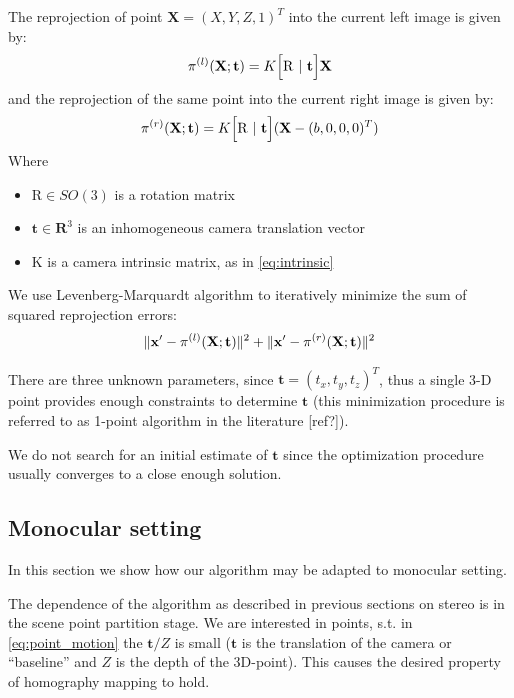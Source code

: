\documentclass{bmvc2k}
\DeclarePairedDelimiter{\norm}{\lVert}{\rVert}
\begin{document}
The reprojection of point $\mathbf{X}=(X,Y,Z,1)^T$ into the current
left image is given by:
\begin{equation}
  \pi^{(l)}(\mathbf{X};\mathbf{t}) =  K\Bigl[ \mathrm{R}\ |\ \mathbf{t} \Bigr]\mathbf{X} 
\end{equation}
and the reprojection of the same point into the current right image is
given by:
\begin{equation}
  \pi^{(r)}(\mathbf{X};\mathbf{t}) =  K\Bigl[ \mathrm{R}\ |\ \mathbf{t} \Bigr](\mathbf{X} - (b,0,0,0)^T)
\end{equation}
Where 
\begin{itemize}
\item $\mathrm{R}\in SO(3)$ is a rotation matrix
\item $\mathbf{t}\in \mathbf{R}^3$ is an inhomogeneous camera translation vector
\item $\mathrm{K}$ is a camera intrinsic matrix, as in \ref{eq:intrinsic}
\end{itemize}

We use Levenberg-Marquardt algorithm to iteratively minimize the sum
of squared reprojection errors:
\begin{equation}
\norm{\mathbf{x'} - \pi^{(l)}(\mathbf{X};\mathbf{t})}^2 + \norm{\mathbf{x'} - \pi^{(r)}(\mathbf{X};\mathbf{t})}^2
\end{equation}

There are three unknown parameters, since $\mathbf{t} =
(t_x,t_y,t_z)^T$, thus a single 3-D point provides enough constraints
to determine $\mathbf{t}$ (this minimization procedure is referred to
as 1-point algorithm in the literature [ref?]).

We do not search for an initial estimate of $\mathbf{t}$ since the
optimization procedure usually converges to a close enough solution.

\subsection{Monocular setting}

In this section we show how our algorithm may be adapted to monocular
setting.

The dependence of the algorithm as described in previous sections on
stereo is in the scene point partition stage.  We are interested in
points, s.t. in \ref{eq:point_motion} the $\mathbf{t}/Z$ is small
($\mathbf{t}$ is the translation of the camera or ``baseline'' and $Z$
is the depth of the 3D-point). This causes the desired property of
homography mapping to hold.
\end{document}
